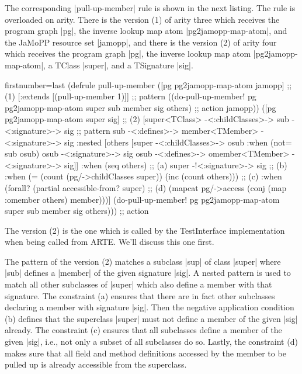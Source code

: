 \documentclass[submission]{eptcs}
\newcommand{\code}{\clojureinline}
\begin{document}
The corresponding \code|pull-up-member| rule is shown in the next listing.  The
rule is overloaded on arity.  There is the version (1) of arity three which
receives the program graph \code|pg|, the inverse lookup map atom
\code|pg2jamopp-map-atom|, and the JaMoPP resource set \code|jamopp|, and there
is the version (2) of arity four which receives the program graph \code|pg|,
the inverse lookup map atom \code|pg2jamopp-map-atom|, a \textsf{TClass}
\code|super|, and a \textsf{TSignature} \code|sig|.

\begin{clojurecode*}{firstnumber=last}
(defrule pull-up-member
  ([pg pg2jamopp-map-atom jamopp]                                             ;; (1)
   [:extends [(pull-up-member 1)]]                                            ;; pattern
   ((do-pull-up-member! pg pg2jamopp-map-atom super sub member sig others)    ;; action
    jamopp))
  ([pg pg2jamopp-map-atom super sig]                                          ;; (2)
   [super<TClass> -<:childClasses>-> sub -<:signature>-> sig                  ;; pattern
    sub -<:defines>-> member<TMember> -<:signature>-> sig
    :nested [others [super -<:childClasses>-> osub
                     :when (not= sub osub)
                     osub -<:signature>-> sig
                     osub -<:defines>-> omember<TMember> -<:signature>-> sig]]
    :when (seq others)                                                        ;; (a)
    super -!<:signature>-> sig                                                ;; (b)
    :when (= (count (pg/->childClasses super)) (inc (count others)))          ;; (c)
    :when (forall? (partial accessible-from? super)                           ;; (d)
                   (mapcat pg/->access (conj (map :omember others) member)))]
   (do-pull-up-member! pg pg2jamopp-map-atom super sub member sig others)))   ;; action
\end{clojurecode*}

The version (2) is the one which is called by the \textsf{TestInterface}
implementation when being called from ARTE.  We'll discuss this one first.

The pattern of the version (2) matches a subclass \code|sup| of class
\code|super| where \code|sub| defines a \code|member| of the given signature
\code|sig|.  A nested pattern is used to match all other subclasses of
\code|super| which also define a member with that signature.  The constraint
(a) ensures that there are in fact other subclasses declaring a member with
signature \code|sig|.  Then the negative application condition (b) defines that
the superclass \code|super| must not define a member of the given \code|sig|
already.  The constraint (c) ensures that all subclasses define a member of the
given \code|sig|, i.e., not only a subset of all subclasses do so.  Lastly, the
constraint (d) makes sure that all field and method definitions accessed by the
member to be pulled up is already accessible from the superclass.
\end{document}
